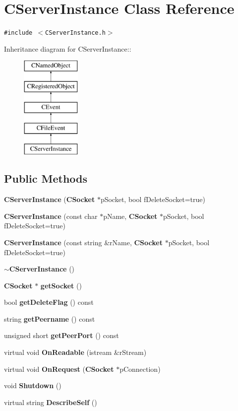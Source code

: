 \section{CServer\-Instance  Class Reference}
\label{classCServerInstance}
{\tt \#include $<$CServer\-Instance.h$>$}

Inheritance diagram for CServer\-Instance::\begin{figure}[H]
\begin{center}
\leavevmode
\includegraphics[height=5cm]{classCServerInstance}
\end{center}
\end{figure}
\subsection*{Public Methods}
\begin{CompactItemize}
\item 
{\bf CServer\-Instance} ({\bf CSocket} $\ast$p\-Socket, bool f\-Delete\-Socket=true)
\item 
{\bf CServer\-Instance} (const char $\ast$p\-Name, {\bf CSocket} $\ast$p\-Socket, bool f\-Delete\-Socket=true)
\item 
{\bf CServer\-Instance} (const string \&r\-Name, {\bf CSocket} $\ast$p\-Socket, bool f\-Delete\-Socket=true)
\item 
{\bf $\sim$CServer\-Instance} ()
\item 
{\bf CSocket} $\ast$ {\bf get\-Socket} ()
\item 
bool {\bf get\-Delete\-Flag} () const
\item 
string {\bf get\-Peername} () const
\item 
unsigned short {\bf get\-Peer\-Port} () const
\item 
virtual void {\bf On\-Readable} (istream \&r\-Stream)
\item 
virtual void {\bf On\-Request} ({\bf CSocket} $\ast$p\-Connection)
\item 
void {\bf Shutdown} ()
\item 
virtual string {\bf Describe\-Self} ()
\end{CompactItemize}
